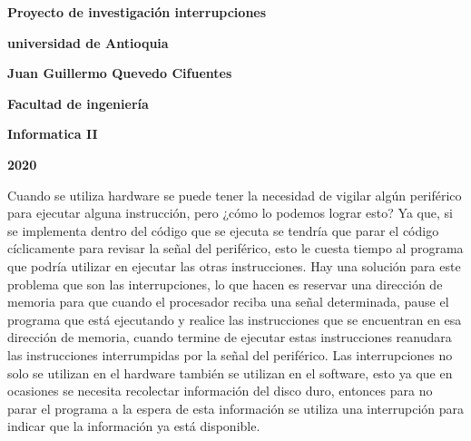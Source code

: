 \documentclass[12pt]{article}
\begin{document}
\begin{center}
\bf{\sc\Huge Proyecto de investigación interrupciones}\\
\end{center}
\vspace{60pt}
\begin{center}
\bf{\sc\Huge universidad de Antioquia}\\
\end{center}
\vspace{120pt}
\begin{center}
\bf{\sc\Huge Juan Guillermo Quevedo Cifuentes }\\
\end{center}
\vspace{120pt}
\begin{center}
\bf{\sc\Huge Facultad de ingeniería}
\end{center}
\vspace{5pt}
\begin{center}
\bf{\sc\Huge Informatica II}
\end{center}
\vspace{5pt}
\begin{center}
\bf{\sc\Huge 2020}\\
\end{center}
\newpage

\large
Cuando se utiliza hardware se puede tener la necesidad de vigilar algún periférico para ejecutar alguna instrucción, pero ¿cómo lo podemos lograr esto? Ya que, si se implementa dentro del código que se ejecuta se tendría que parar el código cíclicamente para revisar la señal del periférico, esto le cuesta tiempo al programa que podría utilizar en ejecutar las otras instrucciones. Hay una solución para este problema que son las interrupciones, lo que hacen es reservar una dirección de memoria para que cuando el procesador reciba una señal determinada, pause el programa que está ejecutando y realice las instrucciones que se encuentran en esa dirección de memoria, cuando termine de ejecutar estas instrucciones reanudara las instrucciones interrumpidas por la señal del periférico. Las interrupciones no solo se utilizan en el hardware también se utilizan en el software, esto ya que en ocasiones se necesita recolectar información del disco duro, entonces para no parar el programa a la espera de esta información se utiliza una interrupción para indicar que la información ya está disponible.\cite{Sistemasintegrados}

\vspace{10}
\end{document}
